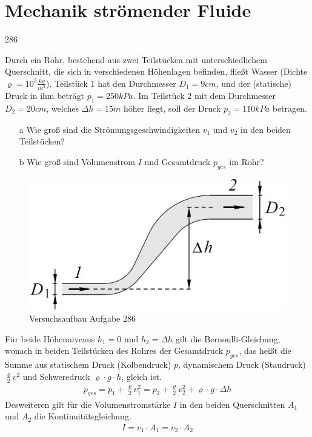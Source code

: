 \section{Mechanik strömender Fluide}
\begin{auf}
    286
\end{auf}
Durch ein Rohr, bestehend aus zwei Teilstücken mit unterschiedlichem Querschnitt, die sich in verschiedenen Höhenlagen befinden, fließt Wasser (Dichte $\varrho=10^3\frac{kg}{m^3}$). Teilstück 1 hat den Durchmesser $D_1=9cm$, und der (statische) Druck in ihm beträgt $p_1=250kPa$. Im Teilstück 2 mit dem Durchmesser $D_2=20cm$, welches $\Delta h=15m$ höher liegt, soll der Druck $p_2=110kPa$ betragen.
\begin{enumerate}
    \item[a] Wie groß sind die Strömungsgeschwindigkeiten $v_1$ und $v_2$ in den beiden Teilstücken?
    \item[b] Wie groß sind Volumenstrom $I$ und Gesamtdruck $p_{ges}$ im Rohr?
\end{enumerate}
\begin{figure}[h]
    \centering
    \includegraphics[width=0.7\linewidth]{images/286_0.png}
    \caption{Versuchsaufbau Aufgabe 286}
\end{figure}
Für beide Höhenniveaus $h_1=0$ und $h_2=\Delta h$ gilt die Bernoulli-Gleichung, wonach in beiden Teilstücken des Rohres der Gesamtdruck $p_{ges}$, das heißt die Summe aus statischem Druck (Kolbendruck) $p$, dynamischem Druck (Staudruck) $\frac{\varrho}{2}v^2$ und Schweredruck $\varrho\cdot g\cdot h$, gleich ist.
\begin{align}
    p_{ges}=p_1+\frac{\varrho}{2}v_1^2=p_2+\frac{\varrho}{2}v_2^2+\varrho\cdot g\cdot\Delta h	\label{eq:286_bernoulli}
\end{align}
Desweiteren gilt für die Volumenstromstärke $I$ in den beiden Querschnitten $A_1$ und $A_2$ die Kontinuitätsgleichung.
\begin{align}
    I=v_1\cdot A_1=v_2\cdot A_2	\label{}
\end{align}